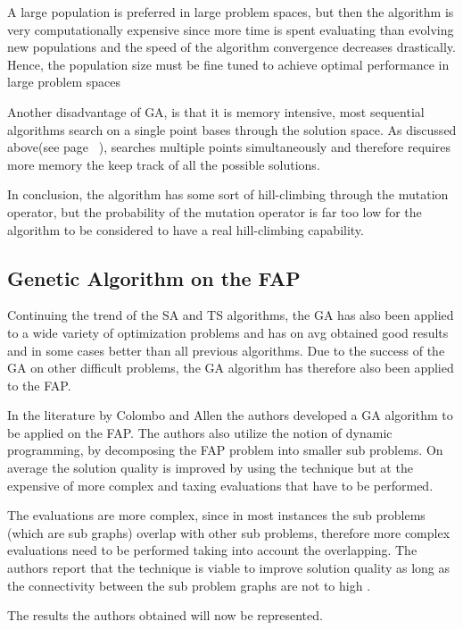 A large population is preferred in large problem spaces, but then the algorithm is very computationally expensive since more time is spent evaluating than evolving new populations and the speed of the algorithm convergence decreases drastically. Hence, the population size must be fine tuned to achieve optimal performance in large problem spaces

Another disadvantage of GA, is that it is memory intensive, most sequential algorithms search on a single point bases through the solution space. As discussed above(see page ~\pageref{GASearchPoints}), searches multiple points simultaneously and therefore requires more memory the keep track of all the possible solutions.

In conclusion, the algorithm has some sort of hill-climbing through the mutation operator, but the probability of the mutation operator is far too low for the algorithm to be considered to have a real hill-climbing capability.

\subsection{Genetic Algorithm on the FAP}
Continuing the trend of the SA and TS algorithms, the GA has also been applied to a wide variety of optimization problems and has on avg obtained good results and in some cases better than all previous algorithms. Due to the success of the GA on other difficult problems, the GA algorithm has therefore also been applied to the FAP.

In the literature by Colombo and Allen\cite{ProblemDecompMIFAP} the authors developed a GA algorithm to be applied on the FAP. The authors also utilize the notion of dynamic programming, by decomposing the FAP problem into smaller sub problems. On average the solution quality is improved by using the technique but at the expensive of more complex and taxing evaluations that have to be performed\cite{ProblemDecompMIFAP}. 

The evaluations are more complex, since in most instances the sub problems (which are sub graphs) overlap with other sub problems, therefore more complex evaluations need to be performed taking into account the overlapping\cite{ProblemDecompMIFAP}. The authors report that the technique is viable to improve solution quality as long as the connectivity between the sub problem graphs are not to high \cite{ProblemDecompMIFAP}.

The results the authors obtained will now be represented.

